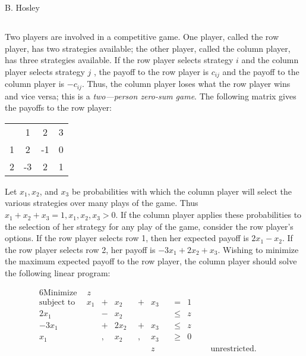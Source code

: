 \documentclass[12pt]{amsart}
\begin{document}
\raggedbottom

\hspace{\fill} {\large B. Hosley}
\bigskip


\setcounter{section}{6}
\setcounter{subsection}{26} %
\subsection{}
Two players are involved in a competitive game. One player, called the 
row player, has two strategies available; the other player, called the column 
player, has three strategies available. If the row player selects strategy \(i\) and the 
column player selects strategy  \(j\) , the payoff to the row player is \(c_{ij}\) and the 
payoff to the column player is \(-c_{ij}\). Thus, the column player loses what the row 
player wins and vice versa; this is a \textit{two—person zero-sum game}. The following 
matrix gives the payoffs to the row player: 

\bigskip
\begin{center}
	\begin{tabular}{cccc}
		& 1                       & 2                       & 3                      \\ \cline{2-4} 
		\multicolumn{1}{c|}{1} & \multicolumn{1}{c|}{2}  & \multicolumn{1}{c|}{-1} & \multicolumn{1}{c|}{0} \\ \cline{2-4} 
		\multicolumn{1}{c|}{2} & \multicolumn{1}{c|}{-3} & \multicolumn{1}{c|}{2}  & \multicolumn{1}{c|}{1} \\ \cline{2-4} 
	\end{tabular}
\end{center}
\bigskip

Let \(x_1, x_2\), and \(x_3\) be probabilities with which the column player will select the 
various strategies over many plays of the game. Thus \(x_1 + x_2 + x_3 = 1, x_1, x_2, 
x_3 > 0\). If the column player applies these probabilities to the selection of her 
strategy for any play of the game, consider the row player's options. If the row 
player selects row 1, then her expected payoff is \(2x_1 - x_2\). If the row player 
selects row 2, her payoff is \(-3x_1 + 2x_2 + x_3\). Wishing to minimize the maximum 
expected payoff to the row player, the column player should solve the following 
linear program: 

\begin{alignat*}{6}
	\text{Minimize}\quad\ z\ \ & {} {} &\qquad& {} {} &\qquad& {} {} &\qquad&{}\qquad    {}  &   & \\
	\text{subject to}\quad\,\ 
	  x_1& {}+{} &  x_2& {}+{} & x_3  &{} =  {}  & 1 & \\
	 2x_1& {}-{} &  x_2& {} {} &      &{}\leq{}  & z & \\
	-3x_1& {}+{} & 2x_2& {}+{} & x_3  &{}\leq{}  & z & \\
	  x_1&,{} {} &  x_2&,{} {} & x_3  &{}\geq{}  & 0 & \\
	     & {} {} &     & {} {} &   z  &{}    {}  &   & \text{unrestricted}. 
\end{alignat*}
\end{document}
